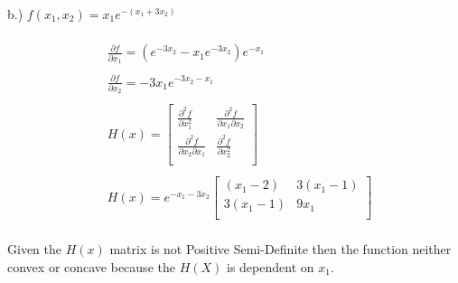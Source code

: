 \documentclass[12pt]{article}
\begin{document}
b.) $f(x_1,x_2) = x_1 e^{-(x_1 + 3x_2)}$\\\\
\begin{align*}
    &\frac{\partial f}{\partial x_1} = (e^{-3x_2} - x_1e^{-3x_2})e^{-x_1}\\ \\
    &\frac{\partial f}{\partial x_2} = -3x_1e^{-3x_2-x_1} \\ \\  
        &H(x) = 
        \begin{bmatrix}
          \frac{\partial^2 f}{\partial x_1^2} & \frac{\partial^2 f}{\partial x_1 \partial x_2} \\
          \frac{\partial^2 f}{\partial x_2 \partial x_1} & \frac{\partial^2 f}{\partial x_2^2} \\
        \end{bmatrix} \\ \\
    &H(x) = e^{-x_1-3x_2}
        \begin{bmatrix}
            (x_1 - 2) & 3(x_1-1) \\
            3(x_1-1) & 9x_1 \\
        \end{bmatrix}
\end{align*}\\

Given the $H(x)$ matrix is not Positive Semi-Definite then the function neither convex or concave because the $H(X)$ is dependent on $x_1$.\\
\end{document}
